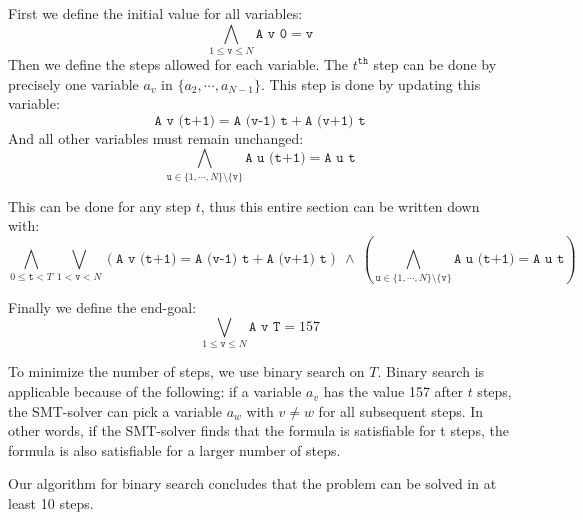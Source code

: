 \documentclass[12pt]{article}
\begin{document}
First we define the initial value for all variables:
\[ \bigwedge_{1 \le \texttt{v} \le N} \texttt{A v 0} = \texttt{v} \]
Then we define the steps allowed for each variable.
The $t^\mathtt{th}$ step can be done by precisely one variable $a_v$ in $\{ a_2, \cdots, a_{N-1} \}$.
This step is done by updating this variable:
\[\texttt{A v (t+1)} = \texttt{A (v-1) t} + \texttt{A (v+1) t}\]
And all other variables must remain unchanged:
\[\bigwedge_{ \texttt{u} \in \{1, \cdots, N\} \setminus \{ \texttt{v} \} } \texttt{A u (t+1)} = \texttt{A u t}\]

This can be done for any step $t$, thus this entire section can be written down with:
\[
    \bigwedge_{0 \le \texttt{t} < T}
    \bigvee_{1 < \texttt{v} < N}
        \left (\texttt{A v (t+1)} = \texttt{A (v-1) t} + \texttt{A (v+1) t} \right)
        ~\wedge~
        \left( \bigwedge_{ \texttt{u} \in \{1, \cdots, N\} \setminus \{ \texttt{v} \} } \texttt{A u (t+1)} = \texttt{A u t} \right)
\]

Finally we define the end-goal:
\[ \bigvee_{1 \le \texttt{v} \le N} \texttt{A v T} = 157 \]

To minimize the number of steps, we use binary search on $T$.
Binary search is applicable because of the following:
if a variable $a_v$ has the value 157 after $t$ steps, the SMT-solver can pick a variable $a_w$ with $v \ne w$ for all subsequent steps.
In other words, 
if the SMT-solver finds that the formula is satisfiable for t steps, 
the formula is also satisfiable for a larger number of steps.


Our algorithm for binary search concludes that the problem can be solved in at least 10 steps.
\end{document}
